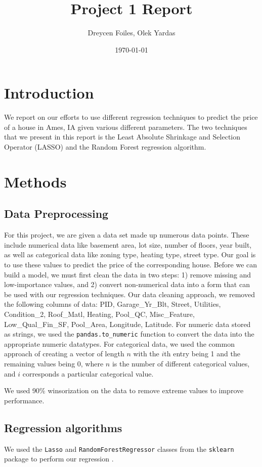 \documentclass{article}
\title{Project 1 Report}
\author{Dreycen Foiles, Olek Yardas}
\date{\today}
\begin{document}
\maketitle

\section{Introduction}

We report on our efforts to use different regression techniques to predict the price of a house in Ames, IA given various different parameters. The two techniques that we present in this report is the Least Absolute Shrinkage and Selection Operator (LASSO) and the Random Forest regression algorithm.

\section{Methods}

\subsection{Data Preprocessing}
For this project, we are given a data set made up numerous data points. These
include numerical data like basement area,  lot size, number of floors, year
built, as well as categorical data like zoning type, heating type, street type.
Our goal is to use these values to predict the price of the corresponding house.
Before we can build a model, we must first clean the data in two steps:
1) remove missing and low-importance values, and 2) convert non-numerical data
into a form that can be used with our regression techniques. Our data cleaning
approach, we removed the following columns of data:
PID, Garage\_Yr\_Blt, Street, Utilities, Condition\_2, Roof\_Matl, Heating,
Pool\_QC, Misc\_Feature, Low\_Qual\_Fin\_SF, Pool\_Area, Longitude, Latitude.
For numeric data stored as strings, we used the \verb,pandas.to_numeric, 
function to convert the data into the appropriate numeric datatypes. For
categorical data, we used the common approach of creating a vector of length
$n$ with the $i$th entry being 1 and the remaining values being 0, where $n$ is
the number of different categorical values, and $i$ corresponds a particular
categorical value.

We used 90\% winsorization on the data to remove extreme values to improve performance.

\subsection{Regression algorithms}
We used the \verb.Lasso. and \verb.RandomForestRegressor. classes from the
\verb.sklearn. package to perform our regression
.
\end{document}
